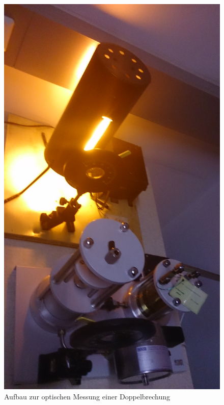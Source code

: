 \documentclass[12pt,a4paper]{article}
\begin{document}
\begin{multicols}{2}
\begin{figure}[H]
	\centering
	\includegraphics[scale=0.07,angle=-90]{./data/PS5_2_Aufbau.jpg}
	\caption{Aufbau zur optischen Messung einer Doppelbrechung}
	\label{fig:spannung_aufbau}
\end{figure}


\end{multicols}
\end{document}
